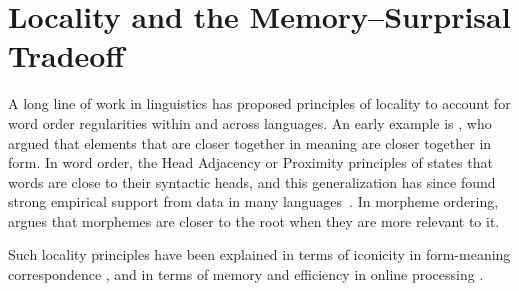 \documentclass[11pt,letterpaper]{article}
\newcommand{\citep}{\parencite}
\newcommand{\citet}{\Textcite}
\begin{document}








\section{Locality and the Memory--Surprisal Tradeoff}

A long line of work in linguistics has proposed principles of locality to account for word order regularities within and across languages.
An early example is \citet{behaghel1932deutsche}, who argued that elements that are closer together in meaning are closer together in form.
In word order, the Head Adjacency or Proximity principles of \citet{frazier1985syntactic,rijkhoff-word-1986} states that words are close to their syntactic heads, and this generalization has since found strong empirical support from data in many languages~\citep[e.g.][]{hawkins-performance-1994,liu2008dependency, futrell-large-scale-2015-1, liu-dependency-2017}.
In morpheme ordering, \citet{bybee-morphology-1985} argues that morphemes are closer to the root when they are more relevant to it.

Such locality principles have been explained in terms of iconicity in form-meaning correspondence \citep{givon1985iconicity}, and in terms of memory and efficiency in online processing \citep{frazier1985syntactic, gibson1998linguistic, hawkins-efficiency-2003, futrell-noisy-context-2017}.
\end{document}
